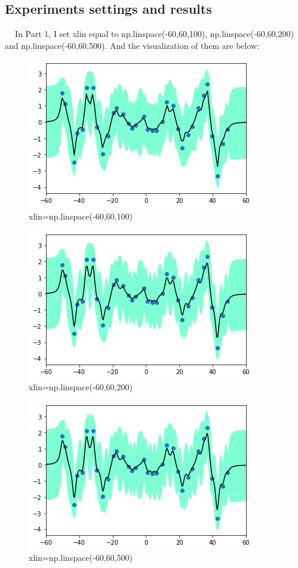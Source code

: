 \documentclass{article}
\begin{document}
\subsection{Experiments settings and results}
$\quad\ $In Part 1, I set xlin equal to np.linspace(-60,60,100), np.linspace(-60,60,200) and np.linspace(-60,60,500). And the visualization of them are below:
\begin{figure}[h!]
\begin{center}
\includegraphics[scale=0.5]{1001.png}
\caption{xlin=np.linspace(-60,60,100)}
\end{center}
\end{figure}
\begin{figure}[h!]
\begin{center}
\includegraphics[scale=0.5]{2001.png}
\caption{xlin=np.linspace(-60,60,200)}
\end{center}
\end{figure}
\begin{figure}[h!]
\begin{center}
\includegraphics[scale=0.5]{5001.png}
\caption{xlin=np.linspace(-60,60,500)}
\end{center}
\end{figure}
\end{document}
